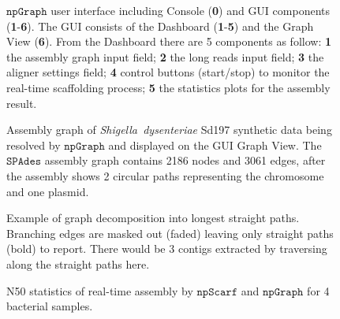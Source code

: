\documentclass[10pt,letterpaper]{article}
\newcommand{\npscarf}{$\mathtt{npScarf}$}
\newcommand{\npgraph}{$\mathtt{npGraph}$}
\newcommand{\spades}{$\mathtt{SPAdes}$}
\begin{document}
\begin{figure}[!hpt]
\centering
\caption{\npgraph{} user interface including Console (\textbf{0}) and GUI components (\textbf{1}-\textbf{6}). The GUI consists of the Dashboard (\textbf{1}-\textbf{5}) and the Graph View (\textbf{6}). From the Dashboard there are 5 components as follow: \textbf{1} the assembly graph input field; \textbf{2} the long reads input field; \textbf{3} the aligner settings field; \textbf{4} control buttons (start/stop) to monitor the real-time scaffolding process; \textbf{5} the statistics plots for the assembly result.}
\label{figure:npgraph_gui}
\end{figure}


\begin{figure}[!hpt]
\centering
\caption{Assembly graph of \emph{Shigella~dysenteriae} Sd197 synthetic data being resolved by \npgraph{} and displayed on the GUI Graph View. The \spades{} assembly graph contains 2186 nodes and 3061 edges, after the assembly shows 2 circular paths representing the chromosome and one plasmid.}
\label{figure:npgraph_graphview}
\end{figure}


\begin{figure}[!hpt]
\centering
\caption{Example of graph decomposition into longest straight paths. Branching edges are masked out (faded) leaving only straight paths (bold) to report. There would be 3 contigs extracted by traversing along the straight paths here.}
\label{figure:npgraph_decompose}
\end{figure}


\begin{figure}[!hbt]
\centering
\caption{N50 statistics of real-time assembly by \npscarf{} and \npgraph{} for 4 bacterial samples.}
\label{F:npgraph_rt}
\end{figure}

\clearpage
\end{document}
